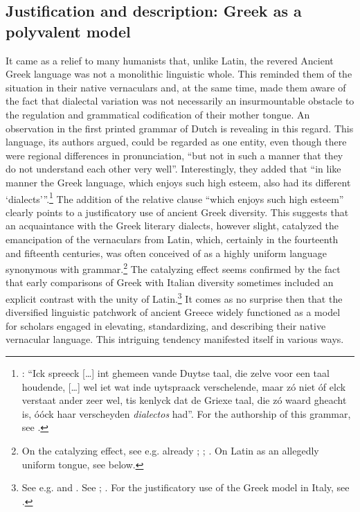 \subsection{Justification and description: Greek as a polyvalent model}\label{sec:8.1.2}

It came as a relief to many humanists that, unlike Latin, the revered Ancient Greek language was not a monolithic linguistic whole. This reminded them of the situation in their native vernaculars and, at the same time, made them aware of the fact that dialectal variation was not necessarily an insurmountable obstacle to the regulation and grammatical codification of their mother tongue. An observation in the first printed grammar of Dutch is revealing in this regard. This language, its authors argued, could be regarded as one entity, even though there were regional differences in pronunciation, “but not in such a manner that they do not understand each other very well”. Interestingly, they added that “in like manner the Greek language, which enjoys such high esteem, also had its different ‘dialects’”.\footnote{\citet[110]{[spieghel]1584}: “Ick spreeck […] int ghemeen vande Duytse taal, die zelve voor een taal houdende, […] wel iet wat inde uytspraack verschelende, maar zó niet óf elck verstaat ander zeer wel, tis kenlyck dat de Griexe taal, die zó waard gheacht is, óóck haar verscheyden \textit{dialectos} had”. For the authorship of this grammar, see \citet{Peeters1982}.} The addition of the relative clause “which enjoys such high esteem” clearly points to a justificatory use of ancient Greek diversity. This suggests that an acquaintance with the Greek literary dialects, however slight, catalyzed the emancipation of the vernaculars from Latin, which, certainly in the fourteenth and fifteenth centuries, was often conceived of as a highly uniform language synonymous with grammar.\footnote{On the catalyzing effect, see e.g. already \citet[688]{Bonfante1953}; \citet[9]{Trapp1990}; \citet[67]{Rhodes2015}. On Latin as an allegedly uniform tongue, see  below.} The catalyzing effect seems confirmed by the fact that early comparisons of Greek with Italian diversity sometimes included an explicit contrast with the unity of Latin.\footnote{See e.g. \citet[\textsc{ii}.41]{Landino1974} and \citet[*.ii\textsc{\textsuperscript{v}}]{Manutius1496Aldus}. See \citet[172--173]{Alinei1984}; \citet[209--210, 215]{Trovato1984}. For the justificatory use of the Greek model in Italy, see \citet[46, 50]{Tavoni1998}.} It comes as no surprise then that the diversified linguistic patchwork of ancient Greece widely functioned as a model for scholars engaged in elevating, standardizing, and describing their native vernacular language. This intriguing tendency manifested itself in various ways.

